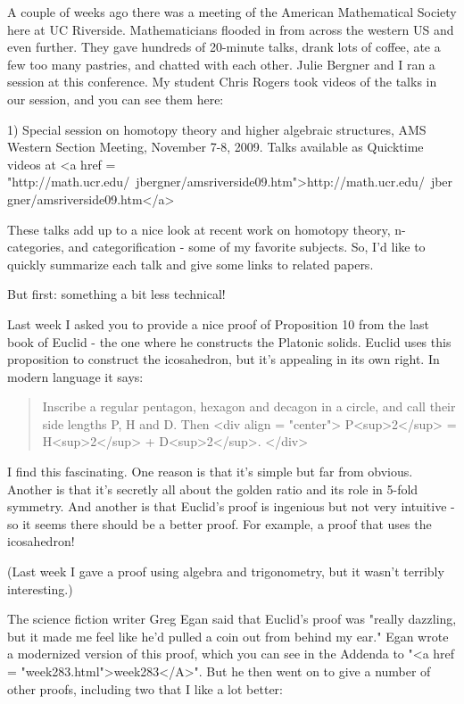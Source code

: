 


A couple of weeks ago there was a meeting of the American Mathematical
Society here at UC Riverside.  Mathematicians flooded in from across
the western US and even further.  They gave hundreds of 20-minute
talks, drank lots of coffee, ate a few too many pastries, and chatted
with each other.  Julie Bergner and I ran a session at this
conference.  My student Chris Rogers took videos of the talks in our
session, and you can see them here:

1) Special session on homotopy theory and higher algebraic structures,
AMS Western Section Meeting, November 7-8, 2009.  Talks available as
Quicktime videos at <a href =
"http://math.ucr.edu/~jbergner/amsriverside09.htm">http://math.ucr.edu/~jbergner/amsriverside09.htm</a>

These talks add up to a nice look at recent work on homotopy theory,
n-categories, and categorification - some of my favorite subjects.
So, I'd like to quickly summarize each talk and give some links to
related papers.

But first: something a bit less technical!

Last week I asked you to provide a nice proof of Proposition 10 from
the last book of Euclid - the one where he constructs the Platonic
solids.  Euclid uses this proposition to construct the icosahedron,
but it's appealing in its own right.  In modern language it says:

\begin{quote}
 Inscribe a regular pentagon, hexagon and decagon in a circle,
 and call their side lengths P, H and D.  Then 
<div align = "center">
P<sup>2</sup> = H<sup>2</sup> + D<sup>2</sup>.
</div>
\end{quote}
    

I find this fascinating.  One reason is that it's simple but far from
obvious.  Another is that it's secretly all about the golden ratio and
its role in 5-fold symmetry.  And another is that Euclid's proof is
ingenious but not very intuitive - so it seems there should be a
better proof.  For example, a proof that uses the icosahedron!

(Last week I gave a proof using algebra and trigonometry, but
it wasn't terribly interesting.)

The science fiction writer Greg Egan said that Euclid's proof was
"really dazzling, but it made me feel like he'd pulled a coin out
from behind my ear." Egan wrote a modernized version of this
proof, which you can see in the Addenda to "<a href =
"week283.html">week283</A>".  But he then went on to give a
number of other proofs, including two that I like a lot better:

